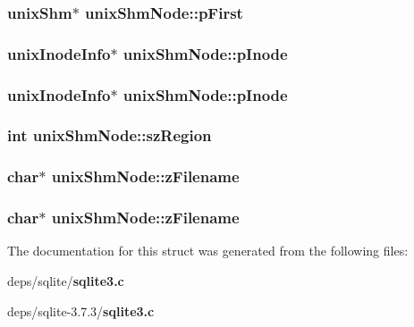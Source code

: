 \subsubsection{\setlength{\rightskip}{0pt plus 5cm}\bf{unix\-Shm}$\ast$ \bf{unix\-Shm\-Node::p\-First}}\label{structunixShmNode_6bc3a47d3b69736155bb7883ffe03b20}


\subsubsection{\setlength{\rightskip}{0pt plus 5cm}\bf{unix\-Inode\-Info}$\ast$ \bf{unix\-Shm\-Node::p\-Inode}}\label{structunixShmNode_a8ae9b221d46d055ab27c3005bcb46b9}


\subsubsection{\setlength{\rightskip}{0pt plus 5cm}\bf{unix\-Inode\-Info}$\ast$ \bf{unix\-Shm\-Node::p\-Inode}}\label{structunixShmNode_a8ae9b221d46d055ab27c3005bcb46b9}


\subsubsection{\setlength{\rightskip}{0pt plus 5cm}int \bf{unix\-Shm\-Node::sz\-Region}}\label{structunixShmNode_c74a449af6c2c58a88b282366f78012e}


\subsubsection{\setlength{\rightskip}{0pt plus 5cm}char$\ast$ \bf{unix\-Shm\-Node::z\-Filename}}\label{structunixShmNode_1928851e5423b2a2e97babb7f6ad5095}


\subsubsection{\setlength{\rightskip}{0pt plus 5cm}char$\ast$ \bf{unix\-Shm\-Node::z\-Filename}}\label{structunixShmNode_1928851e5423b2a2e97babb7f6ad5095}




The documentation for this struct was generated from the following files:\begin{CompactItemize}
\item 
deps/sqlite/\bf{sqlite3.c}\item 
deps/sqlite-3.7.3/\bf{sqlite3.c}\end{CompactItemize}
